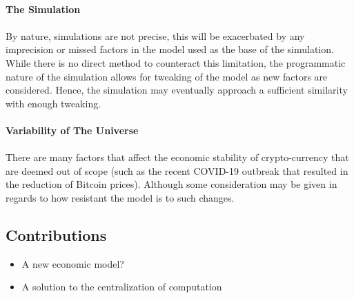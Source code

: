 \paragraph{The Simulation}

\paragraph{} By nature, simulations are not precise, this will be exacerbated by any imprecision or missed factors in the model used as the base of the simulation. While there is no direct method to counteract this limitation, the programmatic nature of the simulation allows for tweaking of the model as new factors are considered. Hence, the simulation may eventually approach a sufficient similarity with enough tweaking.

\paragraph{Variability of The Universe} %

\paragraph{} There are many factors that affect the economic stability of crypto-currency that are deemed out of scope (such as the recent  COVID-19 outbreak that resulted in the reduction of Bitcoin prices). Although some consideration may be given in regards to how resistant the model is to such changes.

\subsection{Contributions}

\begin{itemize}
  \item A new economic model?
  \item A solution to the centralization of computation
\end{itemize}